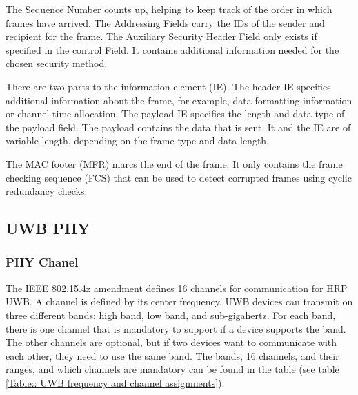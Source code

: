 The Sequence Number counts up, helping to keep track of the order in which frames have arrived.
The Addressing Fields carry the IDs of the sender and recipient for the frame.
The Auxiliary Security Header Field only exists if specified in the control Field.
It contains additional information needed for the chosen security method.

There are two parts to the information element (IE).
The header IE specifies additional information about the frame, for example, data formatting information or channel time allocation.
The payload IE specifies the length and data type of the payload field.
The payload contains the data that is sent.
It and the IE are of variable length, depending on the frame type and data length.

The MAC footer (MFR) marcs the end of the frame.
It only contains the frame checking sequence (FCS) that can be used to detect corrupted frames using cyclic redundancy checks.

\subsection{UWB PHY}
\label{ss:UWB_PHY}

\subsubsection{PHY Chanel}

The IEEE 802.15.4z amendment defines 16 channels for communication for HRP UWB. 
A channel is defined by its center frequency.
UWB devices can transmit on three different bands: high band, low band, and sub-gigahertz.
For each band, there is one channel that is mandatory to support if a device supports the band.
The other channels are optional, but if two devices want to communicate with each other, they need to use the same band.
The bands, 16 channels, and their ranges, and which channels are mandatory can be found in the table  (see table \ref{Table:: UWB frequency and channel assignments}).


